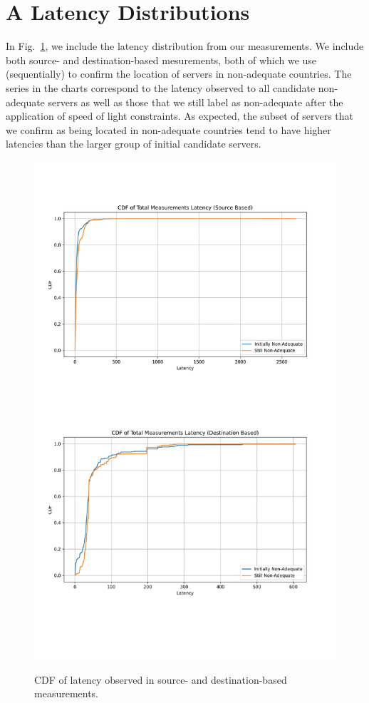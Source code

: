 \section*{A Latency Distributions}
In Fig.~\ref{fig:latencies}, we include the latency distribution from our measurements.
We include both source- and destination-based mesurements, both of which we use
(sequentially) to confirm the location of servers in non-adequate countries. The series
in the charts correspond to the latency observed to all candidate non-adequate servers
as well as those that we still label as non-adequate after the application of
speed of light constraints. As expected, the subset of servers that we confirm as being located in
non-adequate countries tend to have higher latencies than the larger group of initial candidate
servers.

\begin{figure}
\vspace{-4mm}
    \centering
    \includegraphics[width=.46\textwidth]{figures/Latencies.pdf}\\
    \caption{CDF of latency observed in source- and destination-based measurements.}
\label{fig:latencies}
\vspace{-4mm}
\end{figure}

